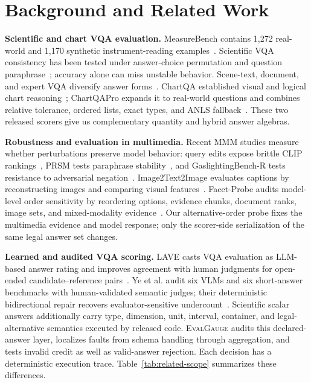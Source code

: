 \documentclass[a4paper]{llncs}
\newcommand{\tool}{\textsc{EvalGauge}}
\begin{document}
\section{Background and Related Work}
\textbf{Scientific and chart VQA evaluation.} MeasureBench contains 1,272 real-world and 1,170 synthetic instrument-reading examples~\cite{lin2026measurebench}. Scientific VQA consistency has been tested under answer-choice permutation and question paraphrase~\cite{quan2025scientificvqa}; accuracy alone can miss unstable behavior. Scene-text, document, and expert VQA diversify answer forms~\cite{biten2019stvqa,mathew2021docvqa,yue2024mmmu}. ChartQA established visual and logical chart reasoning~\cite{masry2022chartqa}; ChartQAPro expands it to real-world questions and combines relative tolerance, ordered lists, exact types, and ANLS fallback~\cite{masry2025chartqapro}. These two released scorers give us complementary quantity and hybrid answer algebras.

\textbf{Robustness and evaluation in multimedia.} Recent MMM studies measure whether perturbations preserve model behavior: query edits expose brittle CLIP rankings~\cite{tran2026brittleness}, PRSM tests paraphrase stability~\cite{schlegel2026prsm}, and GaslightingBench-R tests resistance to adversarial negation~\cite{zhu2026gaslighting}. Image2Text2Image evaluates captions by reconstructing images and comparing visual features~\cite{huang2025image2text2image}. Facet-Probe audits model-level order sensitivity by reordering options, evidence chunks, document ranks, image sets, and mixed-modality evidence~\cite{paruchuri2026sameevidence}. Our alternative-order probe fixes the multimedia evidence and model response; only the scorer-side serialization of the same legal answer set changes.

\textbf{Learned and audited VQA scoring.} LAVE casts VQA evaluation as LLM-based answer rating and improves agreement with human judgments for open-ended candi\-date--reference pairs~\cite{manas2024lave}. Ye et al. audit six VLMs and six short-answer benchmarks with human-validated semantic judges; their deterministic bidirectional repair recovers evalu\-ator-sensitive undercount~\cite{ye2026vqascore}. Scientific scalar answers additionally carry type, dimension, unit, interval, container, and legal-alternative semantics executed by released code. \tool{} audits this declared-answer layer, localizes faults from schema handling through aggregation, and tests invalid credit as well as valid-answer rejection. Each decision has a deterministic execution trace. Table~\ref{tab:related-scope} summarizes these differences.
\end{document}
